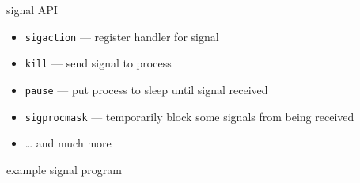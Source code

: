 \begin{frame}{signal API}
\begin{itemize}
    \item {\tt sigaction} --- register handler for signal
    \item {\tt kill} --- send signal to process
    \item {\tt pause} --- put process to sleep until signal received
    \item {\tt sigprocmask} --- temporarily block some signals from being received
    \item \ldots{} and much more
\end{itemize}
\end{frame}

\begin{frame}[fragile,label=exSignals]{example signal program}

\end{frame}

